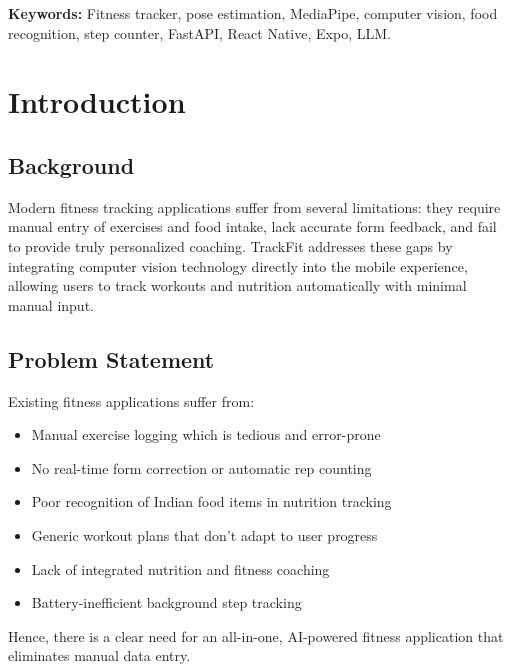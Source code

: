 \documentclass[12pt]{report}
\begin{document}
\vspace{0.5cm}
\noindent\textbf{Keywords:} Fitness tracker, pose estimation, MediaPipe, computer vision, food recognition, step counter, FastAPI, React Native, Expo, LLM.

\newpage
\tableofcontents
\newpage
\listoffigures
\newpage
\listoftables
\newpage
{}

\chapter{Introduction}
\section{Background}
Modern fitness tracking applications suffer from several limitations: they require manual entry of exercises and food intake, lack accurate form feedback, and fail to provide truly personalized coaching. TrackFit addresses these gaps by integrating computer vision technology directly into the mobile experience, allowing users to track workouts and nutrition automatically with minimal manual input.

\section{Problem Statement}
Existing fitness applications suffer from:
\begin{itemize}
    \item Manual exercise logging which is tedious and error-prone
    \item No real-time form correction or automatic rep counting
    \item Poor recognition of Indian food items in nutrition tracking
    \item Generic workout plans that don't adapt to user progress
    \item Lack of integrated nutrition and fitness coaching
    \item Battery-inefficient background step tracking
\end{itemize}
Hence, there is a clear need for an all-in-one, AI-powered fitness application that eliminates manual data entry.
\end{document}

